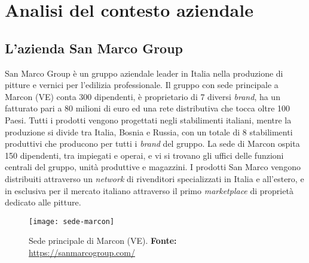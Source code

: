 
\chapter{Analisi del contesto aziendale}
\label{cap:analisi-del-contesto-aziendale}





\section{L'azienda San Marco Group}

San Marco Group è un gruppo aziendale leader in Italia nella produzione di pitture e vernici per l'edilizia professionale. Il gruppo con sede principale a Marcon (VE) conta 300 dipendenti, è proprietario di 7 diversi \textit{brand}, ha un fatturato pari a 80 milioni di euro ed una rete distributiva che tocca oltre 100 Paesi. Tutti i prodotti vengono progettati negli stabilimenti italiani, mentre la produzione si divide tra Italia, Bosnia e Russia, con un totale di 8 stabilimenti produttivi che producono per tutti i \textit{brand} del gruppo. La sede di Marcon ospita 150 dipendenti, tra impiegati e operai, e vi si trovano gli uffici delle funzioni centrali del gruppo, unità produttive e magazzini. I prodotti San Marco vengono distribuiti attraverso un \textit{network} di rivenditori specializzati in Italia e all'estero, e in esclusiva per il mercato italiano attraverso il primo \textit{marketplace} di proprietà dedicato alle pitture.

\vspace{10pt}
\begin{figure}[htbp]
	\begin{center}
		\texttt{[image: sede-marcon]}
		\caption{Sede principale di Marcon (VE). \newline \textbf{Fonte: }\url{https://sanmarcogroup.com/}}
	\end{center}
\end{figure}
\vspace{20pt}

